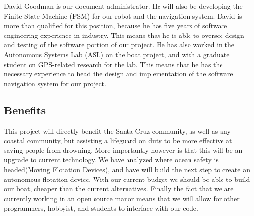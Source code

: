 \documentclass[11pt]{article}
\begin{document}
David Goodman is our document administrator. He will also be developing the Finite State Machine (FSM) for our robot and the navigation system. David is more than qualified for this position, because he has five years of software engineering experience in industry. This means that he is able to oversee design and testing of the software portion of our project. He has also worked in the Autonomous Systems Lab (ASL) on the boat project, and with a graduate student on GPS-related research for the lab. This means that he has the necessary experience to head the design and implementation of the software  navigation system for our project. 


\subsection*{Benefits}

This project will directly benefit the Santa Cruz community, as well as any coastal community, but assisting a lifeguard on duty to be more effective at saving people from drowning. More importantly however is that this will be an upgrade to current technology. We have analyzed where ocean safety is headed(Moving Flotation Devices), and have will build the next step to create an autonomous flotation device. With our current budget we should be able to build our boat, cheaper than the current alternatives. Finally the fact that we are currently working in an open source manor means that we will allow for other programmers, hobbyist, and students to interface with our code. 
\end{document}
